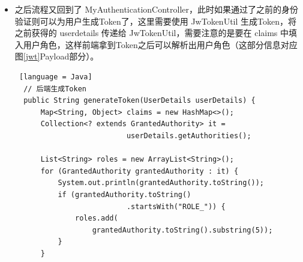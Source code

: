 \begin{enumerate}
\begin{itemize}
\begin{lstlisting} [language = Java]
    public boolean supports(Class<?> authentication) {
        return XXXUsernamePasswordAutenticationToken
                .class
                .isAssignableFrom(authentication);
    }
              \end{lstlisting}
                DaoAuthenticationProvider 是继承 AbstractUserDetailsAuthenticationProvider 的，不同在于 DaoAuthenticationProvider 增加了验证密码的功能，这也正是我们需要的，但是验证密码需要查询数据库也就需要 UserDetailService，所以需要通过 MySecurityConfig 为 XXXAuthProvider 注入不同的 XXXUserDetialsService。这里选择setter注入：
                \begin{lstlisting} [language = Java]
  // XXXDaoAuthProvider
  @Override
  public void setUserDetailsService(
      UserDetailsService userDetailsService) {
      super.setUserDetailsService(userDetailsService);
  }
              \end{lstlisting}
                \begin{lstlisting} [language = Java]
  // MySecurityConfig
  @Autowired
  @Qualifier("XXXUserDetailsService")
  private UserDetailsService XXXUserDetailsService;

  // 注入
  @Bean("XXXDaoAutenticationProvider")
  DaoAuthenticationProvider daoXXXDaoAutenticationProvider() 
  {
    return new XXXDaoAutenticationProvider(
                                passwordEncoder(), 
                                XXXUserDetailsService);
  }
              \end{lstlisting}
                这个过程中涉及的类比较多且关系比较笔复杂，可以参考图\ref{SpringSecurityMultiUser}（经过简化，略去了与该流程相关程度不大的类）。
          \item 之后流程又回到了 MyAuthenticationController，此时如果通过了之前的身份验证则可以为用户生成Token了，这里需要使用 JwTokenUtil 生成Token，将 之前获得的 userdetails 传递给 JwTokenUtil，需要注意的是要在 claims 中填入用户角色，这样前端拿到Token之后可以解析出用户角色（这部分信息对应图\ref{jwt}Payload部分）。
                \begin{lstlisting} [language = Java]
  // 后端生成Token
  public String generateToken(UserDetails userDetails) {
      Map<String, Object> claims = new HashMap<>();
      Collection<? extends GrantedAuthority> it = 
                          userDetails.getAuthorities();

      List<String> roles = new ArrayList<String>();
      for (GrantedAuthority grantedAuthority : it) {
          System.out.println(grantedAuthority.toString());
          if (grantedAuthority.toString()
                          .startsWith("ROLE_")) {
              roles.add(
                  grantedAuthority.toString().substring(5));
          }
      }
      

\end{lstlisting}
\end{itemize}
\end{enumerate}
